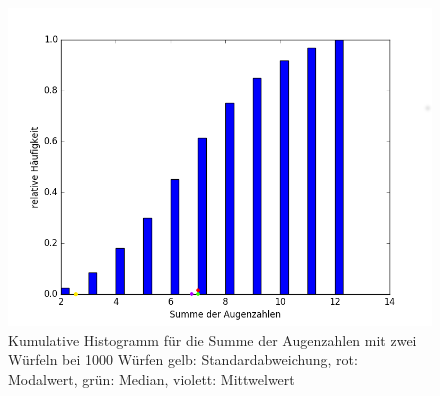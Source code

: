 \documentclass[fleqn,a4paper,12pt]{article}
\begin{document}
\begin{figure}
	\includegraphics[width=1.0\textwidth]{A04_histo2.png}
	\caption{Kumulative Histogramm für die Summe der Augenzahlen mit zwei Würfeln bei 1000 Würfen \newline gelb: Standardabweichung, rot: Modalwert, grün: Median, violett: Mittwelwert}
\end{figure}
\end{document}
